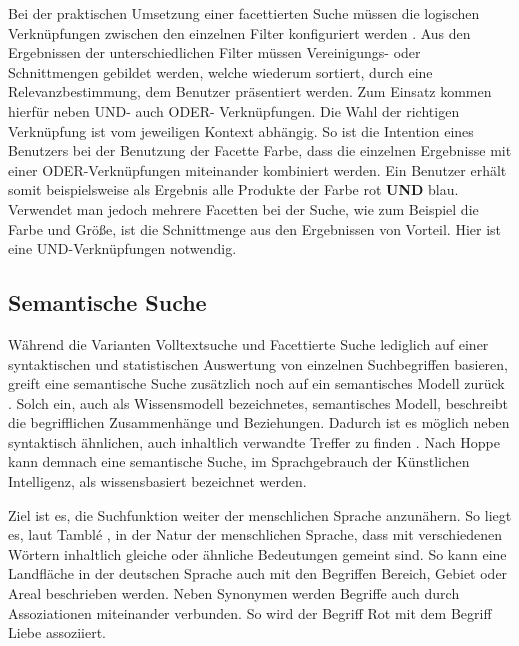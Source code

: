 Bei der praktischen Umsetzung einer facettierten Suche müssen die logischen Verknüpfungen zwischen den einzelnen Filter konfiguriert werden \cite{Martin.2018}. Aus den Ergebnissen der unterschiedlichen Filter müssen Vereinigungs- oder Schnittmengen gebildet werden, welche wiederum sortiert, durch eine Relevanzbestimmung, dem Benutzer präsentiert werden. Zum Einsatz kommen hierfür neben \glqq UND\grqq{}- auch \glqq ODER\grqq{}- Verknüpfungen. Die Wahl der richtigen Verknüpfung ist vom jeweiligen Kontext abhängig. So ist die Intention eines Benutzers bei der Benutzung der Facette \glqq Farbe\grqq{}, dass die einzelnen Ergebnisse mit einer ODER-Verknüpfungen miteinander kombiniert werden. Ein Benutzer erhält somit beispielsweise als Ergebnis alle Produkte der Farbe rot \textbf{UND} blau. Verwendet man jedoch mehrere Facetten bei der Suche, wie zum Beispiel die \glqq Farbe\grqq{} und \glqq Größe\grqq{}, ist die Schnittmenge aus den Ergebnissen von Vorteil. Hier ist eine UND-Verknüpfungen notwendig.

\subsection{Semantische Suche\label{subsec2.3.4:Unterunterpunkt-4}}

Während die Varianten \glqq Volltextsuche\grqq{} und \glqq Facettierte Suche\grqq{} lediglich auf einer syntaktischen und statistischen Auswertung von einzelnen Suchbegriffen basieren, greift eine semantische Suche zusätzlich noch auf ein semantisches Modell zurück \cite[S. 4f]{Hoppe.2020}. Solch ein, auch als \glqq Wissensmodell\grqq{} bezeichnetes, semantisches Modell, beschreibt die begrifflichen Zusammenhänge und Beziehungen. Dadurch ist es möglich neben syntaktisch ähnlichen, auch inhaltlich verwandte Treffer zu finden \cite[S. 3]{Hoppe.2020}. Nach Hoppe \cite[S. 3]{Hoppe.2020} kann demnach eine semantische Suche, im Sprachgebrauch der Künstlichen Intelligenz, als wissensbasiert bezeichnet werden.

Ziel ist es, die Suchfunktion weiter der menschlichen Sprache anzunähern. So liegt es, laut Tamblé \cite{MelanieTamble.2012}, in der Natur der menschlichen Sprache, dass mit verschiedenen Wörtern inhaltlich gleiche oder ähnliche Bedeutungen gemeint sind. So kann eine Landfläche in der deutschen Sprache auch mit den Begriffen \glqq Bereich\grqq{}, \glqq Gebiet\grqq{} oder \glqq Areal\grqq{} beschrieben werden. Neben Synonymen werden Begriffe auch durch Assoziationen miteinander verbunden. So wird der Begriff \glqq Rot\grqq{} mit dem Begriff \glqq Liebe\grqq{} assoziiert.

